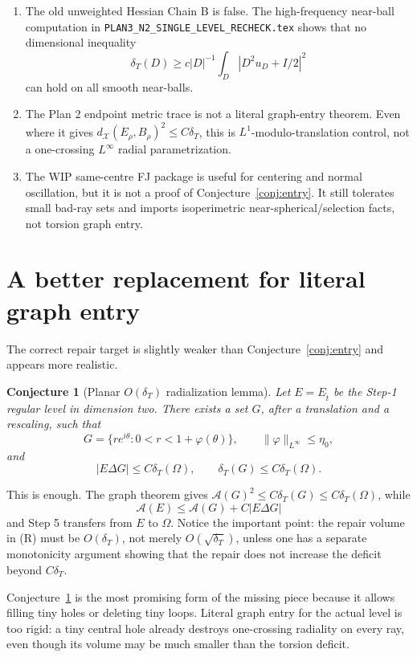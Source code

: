 \documentclass[11pt]{article}
\newtheorem{conjecture}[theorem]{Conjecture}
\newcommand{\Om}{\Omega}
\newcommand{\A}{\mathcal A}
\newcommand{\dT}{\delta_T}
\begin{document}
\begin{enumerate}
\item The old unweighted Hessian Chain B is false.  The high-frequency
near-ball computation in \texttt{PLAN3\_N2\_SINGLE\_LEVEL\_RECHECK.tex}
shows that no dimensional inequality
\[
   \dT(D)\ge c |D|^{-1}\int_D |D^2u_D+I/2|^2
\]
can hold on all smooth near-balls.

\item The Plan 2 endpoint metric trace is not a literal graph-entry
theorem.  Even where it gives \(d_{\mathcal X}(E_\rho,B_\rho)^2\le
C\dT\), this is \(L^1\)-modulo-translation control, not a one-crossing
\(L^\infty\) radial parametrization.

\item The WIP same-centre FJ package is useful for centering and normal
oscillation, but it is not a proof of Conjecture~\ref{conj:entry}.
It still tolerates small bad-ray sets and imports isoperimetric
near-spherical/selection facts, not torsion graph entry.
\end{enumerate}

\section{A better replacement for literal graph entry}

The correct repair target is slightly weaker than
Conjecture~\ref{conj:entry} and appears more realistic.

\begin{conjecture}[Planar \(O(\dT)\) radialization lemma]
\label{conj:radialize}
Let \(E=E_{\hat t}\) be the Step-1 regular level in dimension two.
There exists a set \(G\), after a translation and a rescaling, such that
\[
   G=\{re^{i\theta}:0<r<1+\varphi(\theta)\},
   \qquad
   \|\varphi\|_{L^\infty}\le\eta_0,
\]
and
\[
   |E\Delta G|\le C\dT(\Om),
   \qquad
   \dT(G)\le C\dT(\Om).
   \tag{R}
\]
\end{conjecture}

This is enough.  The graph theorem gives \(\A(G)^2\le C\dT(G)\le
C\dT(\Om)\), while
\[
   \A(E)\le \A(G)+C|E\Delta G|
\]
and Step 5 transfers from \(E\) to \(\Om\).  Notice the important
point: the repair volume in (R) must be \(O(\dT)\), not merely
\(O(\sqrt{\dT})\), unless one has a separate monotonicity argument
showing that the repair does not increase the deficit beyond
\(C\dT\).

Conjecture~\ref{conj:radialize} is the most promising form of the
missing piece because it allows filling tiny holes or deleting tiny
loops.  Literal graph entry for the actual level is too rigid: a tiny
central hole already destroys one-crossing radiality on every ray, even
though its volume may be much smaller than the torsion deficit.
\end{document}
